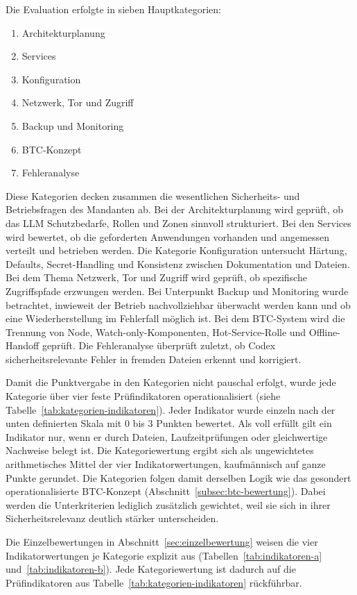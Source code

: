 Die Evaluation erfolgte in sieben Hauptkategorien:

\begin{enumerate}
\item Architekturplanung
\item Services
\item Konfiguration
\item Netzwerk, Tor und Zugriff
\item Backup und Monitoring
\item \ac{BTC}-Konzept
\item Fehleranalyse
\end{enumerate}

Diese Kategorien decken zusammen die wesentlichen Sicherheits- und Betriebsfragen des Mandanten ab. Bei der Architekturplanung wird geprüft, ob das \ac{LLM} Schutzbedarfe, Rollen und Zonen sinnvoll strukturiert. Bei den Services wird bewertet, ob die geforderten Anwendungen vorhanden und angemessen verteilt und betrieben werden. Die Kategorie Konfiguration untersucht Härtung, Defaults, Secret-Handling und Konsistenz zwischen Dokumentation und Dateien. Bei dem Thema Netzwerk, Tor und Zugriff wird geprüft, ob spezifische Zugriffspfade erzwungen werden. Bei Unterpunkt Backup und Monitoring wurde betrachtet, inwieweit der Betrieb nachvollziehbar überwacht werden kann und ob eine Wiederherstellung im Fehlerfall möglich ist. Bei dem \ac{BTC}-System wird die Trennung von Node, Watch-only-Komponenten, Hot-Service-Rolle und Offline-Handoff geprüft. Die Fehleranalyse überprüft zuletzt, ob Codex sicherheitsrelevante Fehler in fremden Dateien erkennt und korrigiert.

Damit die Punktvergabe in den Kategorien nicht pauschal erfolgt, wurde jede
Kategorie über vier feste Prüfindikatoren operationalisiert (siehe Tabelle~\ref{tab:kategorien-indikatoren}). Jeder Indikator wurde einzeln nach der unten definierten Skala mit 0 bis 3 Punkten bewertet.
Als voll erfüllt gilt ein Indikator nur, wenn er durch Dateien, Laufzeitprüfungen oder gleichwertige Nachweise belegt ist. Die Kategoriewertung ergibt sich als ungewichtetes arithmetisches Mittel der vier Indikatorwertungen, kaufmännisch auf ganze Punkte gerundet. 
Die Kategorien folgen damit derselben Logik wie das gesondert operationalisierte \ac{BTC}-Konzept (Abschnitt~\ref{subsec:btc-bewertung}). Dabei werden die Unterkriterien lediglich zusätzlich gewichtet, weil sie sich in ihrer Sicherheitsrelevanz deutlich stärker unterscheiden.

Die Einzelbewertungen in Abschnitt~\ref{sec:einzelbewertung} weisen die vier Indikatorwertungen je Kategorie explizit aus (Tabellen~\ref{tab:indikatoren-a} und~\ref{tab:indikatoren-b}).
Jede Kategoriewertung ist dadurch auf die Prüfindikatoren aus
Tabelle~\ref{tab:kategorien-indikatoren} rückführbar.

